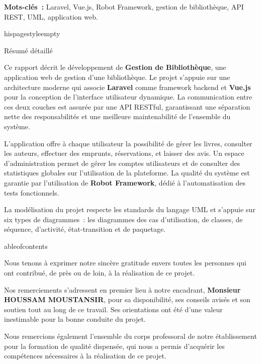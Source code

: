 ﻿\documentclass[12pt,a4paper]{report}
\begin{document}
\vspace{0.5cm}
\noindent\textbf{Mots-cl\'es~:} Laravel, Vue.js, Robot Framework, gestion de biblioth\`eque, API REST, UML, application web.

\clearpage

	hispagestyle{empty}
{}
\begin{center}{\LARGE R\'esum\'e d\'etaill\'e}\end{center}

Ce rapport d\'ecrit le d\'eveloppement de \textbf{Gestion de Biblioth\`eque}, une application web de
gestion d'une biblioth\`eque. Le projet s'appuie sur une architecture moderne qui
associe \textbf{Laravel} comme framework backend et \textbf{Vue.js} pour la conception
de l'interface utilisateur dynamique. La communication entre ces deux couches est
assur\'ee par une API RESTful, garantissant une s\'eparation nette des responsabilit\'es
et une meilleure maintenabilit\'e de l'ensemble du syst\`eme.

L'application offre \`a chaque utilisateur la possibilit\'e de g\'erer les livres, consulter les auteurs,
effectuer des emprunts, r\'eservations, et laisser des avis. Un espace
d'administration permet de g\'erer les comptes utilisateurs et de consulter des
statistiques globales sur l'utilisation de la plateforme. La qualit\'e du syst\`eme
est garantie par l'utilisation de \textbf{Robot Framework}, d\'edi\'e \`a
l'automatisation des tests fonctionnels.

La mod\'elisation du projet respecte les standards du langage UML et s'appuie sur
six types de diagrammes~: les diagrammes des cas d'utilisation, de classes, de
s\'equence, d'activit\'e, \'etat-transition et de paquetage.

\clearpage
	ableofcontents

Nous tenons \`a exprimer notre sinc\`ere gratitude envers toutes les personnes qui ont
contribu\'e, de pr\`es ou de loin, \`a la r\'ealisation de ce projet.

Nos remerciements s'adressent en premier lieu \`a notre encadrant,
\textbf{Monsieur HOUSSAM MOUSTANSIR}, pour sa disponibilit\'e, ses conseils avis\'es
et son soutien tout au long de ce travail. Ses orientations ont \'et\'e d'une valeur
inestimable pour la bonne conduite du projet.

Nous remercions \'egalement l'ensemble du corps professoral de notre \'etablissement
pour la formation de qualit\'e dispens\'ee, qui nous a permis d'acqu\'erir les
comp\'etences n\'ecessaires \`a la r\'ealisation de ce projet.
\end{document}
